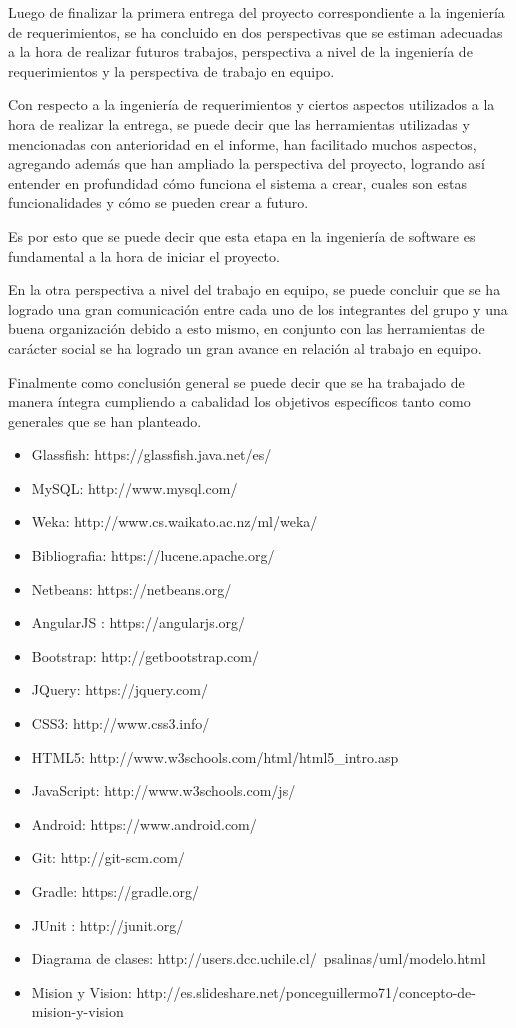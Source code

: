 \documentclass{memoria}
\begin{document}
Luego de finalizar la primera entrega del proyecto correspondiente a la ingeniería de requerimientos, se ha concluido en dos perspectivas que se estiman adecuadas a la hora de realizar futuros trabajos, perspectiva a nivel de la ingeniería de requerimientos y la perspectiva de trabajo en equipo.

Con respecto a la ingeniería de requerimientos y ciertos aspectos utilizados a la hora de realizar la entrega, se puede decir que las herramientas utilizadas y mencionadas con anterioridad en el informe, han facilitado muchos aspectos, agregando además que han ampliado la perspectiva del proyecto, logrando así entender en profundidad cómo funciona el sistema a crear, cuales son estas funcionalidades y cómo se pueden crear a futuro.

Es por esto que se puede decir que esta etapa en la ingeniería de software es fundamental a la hora de iniciar el proyecto.

En la otra perspectiva a nivel del trabajo en equipo, se puede concluir que se ha logrado una gran comunicación entre cada uno de los integrantes del grupo y una buena organización debido a esto mismo, en conjunto con las herramientas de carácter social se ha logrado un gran avance en relación al trabajo en equipo.

Finalmente como conclusión general se puede decir que se ha trabajado de manera íntegra cumpliendo a cabalidad los objetivos específicos tanto como generales que se han planteado.




\begin{itemize}
	\item Glassfish: https://glassfish.java.net/es/
	\item MySQL: http://www.mysql.com/
	\item Weka: http://www.cs.waikato.ac.nz/ml/weka/
	\item Bibliografia: https://lucene.apache.org/
	\item Netbeans: https://netbeans.org/
	\item AngularJS : https://angularjs.org/
	\item Bootstrap: http://getbootstrap.com/
	\item JQuery: https://jquery.com/
	\item CSS3: http://www.css3.info/
	\item HTML5: http://www.w3schools.com/html/html5\_intro.asp
	\item JavaScript: http://www.w3schools.com/js/
	\item Android: https://www.android.com/
	\item Git: http://git-scm.com/
	\item Gradle: https://gradle.org/
	\item JUnit : http://junit.org/
	\item Diagrama de clases: http://users.dcc.uchile.cl/~psalinas/uml/modelo.html
	\item Mision y Vision: http://es.slideshare.net/ponceguillermo71/concepto-de-mision-y-vision
\end{itemize}
\end{document}
